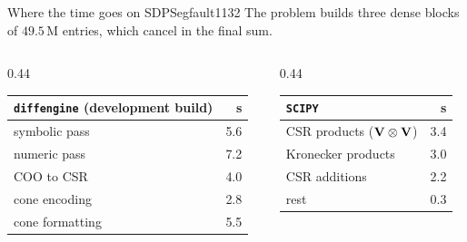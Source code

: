 \documentclass[10pt,mathserif,aspectratio=169]{beamer}
\newcommand{\de}{\texttt{diffengine}}
\begin{document}
\begin{frame}[label=bk-sdpbreak]{Where the time goes on SDPSegfault1132}
\vspace{-0.5ex}
{\small The problem builds three dense blocks of $49.5$\,M entries, which cancel in the final
sum.}

\vspace{0.5ex}
\begin{columns}[T,onlytextwidth]
\begin{column}{0.44\textwidth}
\begin{center}\footnotesize
\begin{tabular}{@{}l r@{}}
\toprule
\de{} (development build) & s \\
\midrule
symbolic pass       & 5.6 \\
numeric pass        & 7.2 \\
COO to CSR          & 4.0 \\
cone encoding       & 2.8 \\
cone formatting     & 5.5 \\
\bottomrule
\end{tabular}
\end{center}
\end{column}
\begin{column}{0.44\textwidth}
\begin{center}\footnotesize
\begin{tabular}{@{}l r@{}}
\toprule
\texttt{SCIPY} & s \\
\midrule
CSR products ($\mathbf{V}\otimes\mathbf{V}$) & 3.4 \\
Kronecker products  & 3.0 \\
CSR additions       & 2.2 \\
rest                & 0.3 \\
\bottomrule
\end{tabular}
\end{center}
\end{column}
\end{columns}


\end{frame}
\end{document}
